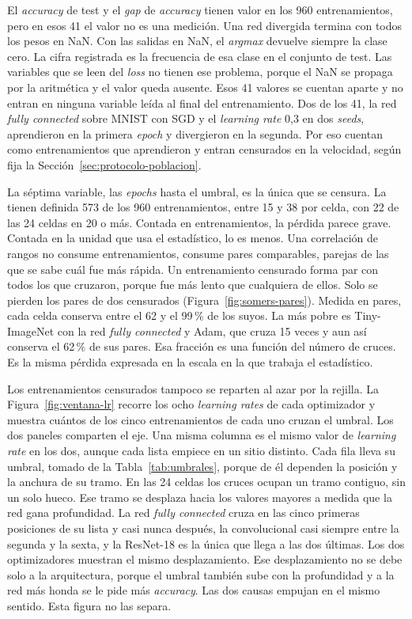 El \emph{accuracy} de test y el \emph{gap} de \emph{accuracy} tienen valor en los 960 entrenamientos, pero en esos 41 el valor no es una medición. Una red divergida termina con todos los pesos en NaN. Con las salidas en NaN, el \emph{argmax} devuelve siempre la clase cero. La cifra registrada es la frecuencia de esa clase en el conjunto de test. Las variables que se leen del \emph{loss} no tienen ese problema, porque el NaN se propaga por la aritmética y el valor queda ausente. Esos 41 valores se cuentan aparte y no entran en ninguna variable leída al final del entrenamiento. Dos de los 41, la red \emph{fully connected} sobre MNIST con SGD y el \emph{learning rate} 0,3 en dos \emph{seeds}, aprendieron en la primera \emph{epoch} y divergieron en la segunda. Por eso cuentan como entrenamientos que aprendieron y entran censurados en la velocidad, según fija la Sección~\ref{sec:protocolo-poblacion}.

La séptima variable, las \emph{epochs} hasta el umbral, es la única que se censura. La tienen definida 573 de los 960 entrenamientos, entre 15 y 38 por celda, con 22 de las 24 celdas en 20 o más. Contada en entrenamientos, la pérdida parece grave. Contada en la unidad que usa el estadístico, lo es menos. Una correlación de rangos no consume entrenamientos, consume pares comparables, parejas de las que se sabe cuál fue más rápida. Un entrenamiento censurado forma par con todos los que cruzaron, porque fue más lento que cualquiera de ellos. Solo se pierden los pares de dos censurados (Figura~\ref{fig:somers-pares}). Medida en pares, cada celda conserva entre el 62 y el 99\,\% de los suyos. La más pobre es Tiny-ImageNet con la red \emph{fully connected} y Adam, que cruza 15 veces y aun así conserva el 62\,\% de sus pares. Esa fracción es una función del número de cruces. Es la misma pérdida expresada en la escala en la que trabaja el estadístico.

Los entrenamientos censurados tampoco se reparten al azar por la rejilla. La Figura~\ref{fig:ventana-lr} recorre los ocho \emph{learning rates} de cada optimizador y muestra cuántos de los cinco entrenamientos de cada uno cruzan el umbral. Los dos paneles comparten el eje. Una misma columna es el mismo valor de \emph{learning rate} en los dos, aunque cada lista empiece en un sitio distinto. Cada fila lleva su umbral, tomado de la Tabla~\ref{tab:umbrales}, porque de él dependen la posición y la anchura de su tramo. En las 24 celdas los cruces ocupan un tramo contiguo, sin un solo hueco. Ese tramo se desplaza hacia los valores mayores a medida que la red gana profundidad. La red \emph{fully connected} cruza en las cinco primeras posiciones de su lista y casi nunca después, la convolucional casi siempre entre la segunda y la sexta, y la ResNet-18 es la única que llega a las dos últimas. Los dos optimizadores muestran el mismo desplazamiento. Ese desplazamiento no se debe solo a la arquitectura, porque el umbral también sube con la profundidad y a la red más honda se le pide más \emph{accuracy}. Las dos causas empujan en el mismo sentido. Esta figura no las separa.

